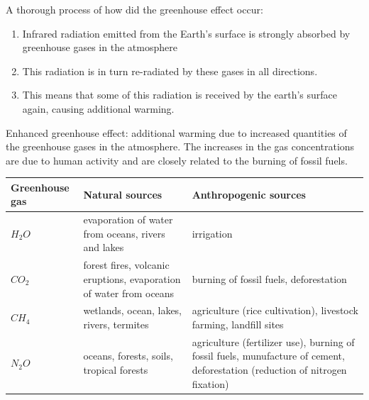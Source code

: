 A thorough process of how did the greenhouse effect occur:
\begin{enumerate}
  \item Infrared radiation emitted from the Earth's surface is strongly absorbed by greenhouse gases in the atmosphere
  \item This radiation is in turn re-radiated by these gases in all directions.
  \item This means that some of this radiation is received by the earth's surface again, causing additional warming.
\end{enumerate}
Enhanced greenhouse effect:  additional warming due to increased quantities of the greenhouse gases in the atmosphere. The increases in the gas concentrations are due to human activity and are closely related to the burning of fossil fuels.
\begin{center}
  \begin{tabularx}{\textwidth}{@{}|Y |Y |Y|@{}}
\toprule
\textbf{Greenhouse gas} & \textbf{Natural sources} & \textbf{Anthropogenic sources}\\
\midrule
$H_2O$ & evaporation of water from oceans, rivers and lakes & irrigation \\\hline
$CO_2$ & forest fires, volcanic eruptions, evaporation of water from oceans & burning of fossil fuels, deforestation \\\hline
$CH_4$ & wetlands, ocean, lakes, rivers, termites & agriculture (rice cultivation), livestock farming, landfill sites \\\hline
$N_2O$ & oceans, forests, soils, tropical forests & agriculture (fertilizer use), burning of fossil fuels, munufacture of cement, deforestation (reduction of nitrogen fixation) \\
\bottomrule
\end{tabularx}
\end{center}
